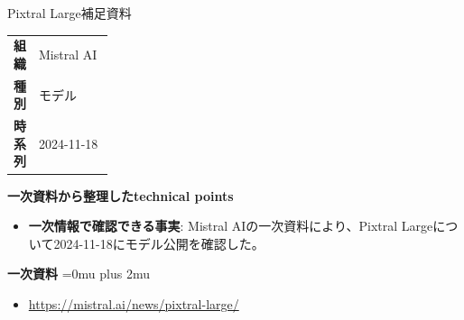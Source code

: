 \begin{technicalnote}{Pixtral Large}{補足資料}
\begingroup
\begin{tabularx}{\linewidth}{@{}>{\bfseries}p{0.22\linewidth}X@{}}
組織 & Mistral AI \\
種別 & モデル \\
時系列 & 2024-11-18 \\
\end{tabularx}
\smallskip
{\bfseries 一次資料から整理したtechnical points}
\begin{itemize}[leftmargin=1.5em,itemsep=0.35em]
\item \textbf{一次情報で確認できる事実}: Mistral AIの一次資料により、Pixtral Largeについて2024-11-18にモデル公開を確認した。
\end{itemize}
\begin{minipage}{\linewidth}
\begin{samepage}
{\bfseries 一次資料}
\begingroup\sloppy
\Urlmuskip=0mu plus 2mu\relax
\begin{itemize}[leftmargin=1.5em,itemsep=0.25em]
\item {\scriptsize\url{https://mistral.ai/news/pixtral-large/}}
\end{itemize}
\endgroup
\end{samepage}
\end{minipage}
\endgroup
\end{technicalnote}
\medskip
